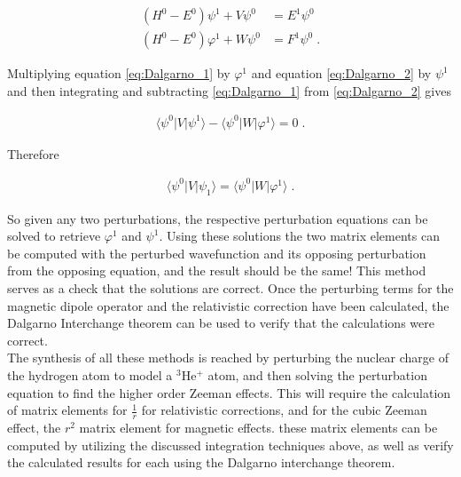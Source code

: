         \begin{align}
            \left( H^0 - E^0 \right) \psi^1 + V \psi^0 &= E^1 \psi^0 \label{eq:Dalgarno_1}\\
            \left( H^0 - E^0 \right) \varphi^1 + W \psi^0 &= F^1 \psi^0 \label{eq:Dalgarno_2}\;.
        \end{align}

        \noindent Multiplying equation \eqref{eq:Dalgarno_1} by $\varphi^1$ and equation \eqref{eq:Dalgarno_2} by $\psi^1$ and then integrating and subtracting \eqref{eq:Dalgarno_1} from \eqref{eq:Dalgarno_2} gives

        \begin{align}
            \langle \psi^0 \vert V \vert \psi^1 \rangle - \langle \psi^0 \vert W \vert \varphi^1 \rangle = 0\;.
        \end{align}

        \noindent Therefore 

        \begin{align}
            \langle \psi^0 \vert V \vert \psi_1 \rangle = \langle \psi^0 \vert W \vert \varphi^1 \rangle\;.
        \end{align}

        So given any two perturbations, the respective perturbation equations can be solved to retrieve $\varphi^1$ and $\psi^1$. Using these solutions the two matrix elements can be computed with the perturbed wavefunction and its opposing perturbation from the opposing equation, and the result should be the same! This method serves as a check that the solutions are correct. Once the perturbing terms for the magnetic dipole operator and the relativistic correction have been calculated, the Dalgarno Interchange theorem can be used to verify that the calculations were correct.\\

        The synthesis of all these methods is reached by perturbing the nuclear charge of the hydrogen atom to model a $^3$He$^+$ atom, and then solving the perturbation equation to find the higher order Zeeman effects. This will require the calculation of matrix elements for $\frac{1}{r}$ for relativistic corrections, and for the cubic Zeeman effect, the $r^2$ matrix element for magnetic effects. these matrix elements can be computed by utilizing the discussed integration techniques above, as well as verify the calculated results for each using the Dalgarno interchange theorem.
    
    